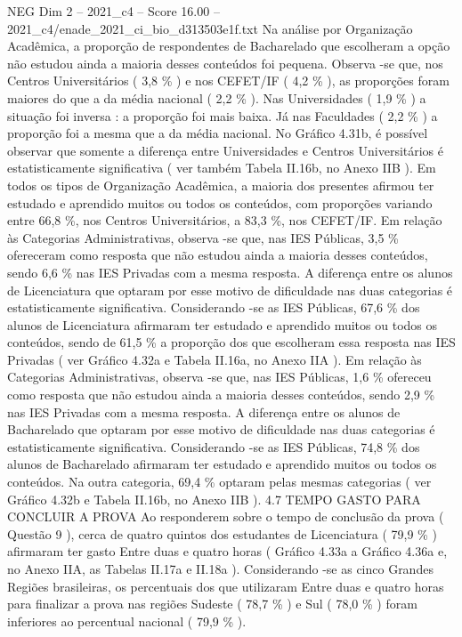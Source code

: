 \begin{textsample}{NEG Dim 2 – 2021\_c4 – Score 16.00 – 2021\_c4/enade\_2021\_ci\_bio\_d313503e1f.txt}
Na análise por Organização Acadêmica, a proporção de respondentes de Bacharelado que escolheram a opção não estudou ainda a maioria desses conteúdos foi pequena.
Observa -se que, nos Centros Universitários ( 3,8 \% ) e nos CEFET/IF ( 4,2 \% ), as proporções foram maiores do que a da média nacional ( 2,2 \% ).
Nas Universidades ( 1,9 \% ) a situação foi inversa : a proporção foi mais baixa.
Já nas Faculdades ( 2,2 \% ) a proporção foi a mesma que a da média nacional.
No Gráfico 4.31b, é possível observar que somente a diferença entre Universidades e Centros Universitários é estatisticamente significativa ( ver também Tabela II.16b, no Anexo IIB ).
Em todos os tipos de Organização Acadêmica, a maioria dos presentes afirmou ter estudado e aprendido muitos ou todos os conteúdos, com proporções variando entre 66,8 \%, nos Centros Universitários, a 83,3 \%, nos CEFET/IF.
Em relação às Categorias Administrativas, observa -se que, nas IES Públicas, 3,5 \% ofereceram como resposta que não estudou ainda a maioria desses conteúdos, sendo 6,6 \% nas IES Privadas com a mesma resposta.
A diferença entre os alunos de Licenciatura que optaram por esse motivo de dificuldade nas duas categorias é estatisticamente significativa.
Considerando -se as IES Públicas, 67,6 \% dos alunos de Licenciatura afirmaram ter estudado e aprendido muitos ou todos os conteúdos, sendo de 61,5 \% a proporção dos que escolheram essa resposta nas IES Privadas ( ver Gráfico 4.32a e Tabela II.16a, no Anexo IIA ).
Em relação às Categorias Administrativas, observa -se que, nas IES Públicas, 1,6 \% ofereceu como resposta que não estudou ainda a maioria desses conteúdos, sendo 2,9 \% nas IES Privadas com a mesma resposta.
A diferença entre os alunos de Bacharelado que optaram por esse motivo de dificuldade nas duas categorias é estatisticamente significativa.
Considerando -se as IES Públicas, 74,8 \% dos alunos de Bacharelado afirmaram ter estudado e aprendido muitos ou todos os conteúdos.
Na outra categoria, 69,4 \% optaram pelas mesmas categorias ( ver Gráfico 4.32b e Tabela II.16b, no Anexo IIB ). 4.7 TEMPO GASTO PARA CONCLUIR A PROVA Ao responderem sobre o tempo de conclusão da prova ( Questão 9 ), cerca de quatro quintos dos estudantes de Licenciatura ( 79,9 \% ) afirmaram ter gasto Entre duas e quatro horas ( Gráfico 4.33a a Gráfico 4.36a e, no Anexo IIA, as Tabelas II.17a e II.18a ).
Considerando -se as cinco Grandes Regiões brasileiras, os percentuais dos que utilizaram Entre duas e quatro horas para finalizar a prova nas regiões Sudeste ( 78,7 \% ) e Sul ( 78,0 \% ) foram inferiores ao percentual nacional ( 79,9 \% ).

\end{textsample}
